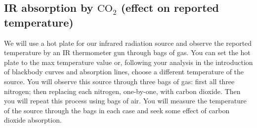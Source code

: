 \subsection{IR absorption by $\text{CO}_2$ (effect on reported temperature)}

We will use a hot plate for our infrared radiation source and observe the reported temperature by an IR thermometer gun through bags of gas. You can set the hot plate to the max temperature value or, following your analysis in the introduction of blackbody curves and absorption lines, choose a different temperature of the source.  You will observe this source through three bags of gas: first all three nitrogen; then replacing each nitrogen, one-by-one, with carbon dioxide.  Then you will repeat this process using bags of air. You will measure the temperature of the source through the bags in each case and seek some effect of carbon dioxide absorption.  \\[-6pt]

